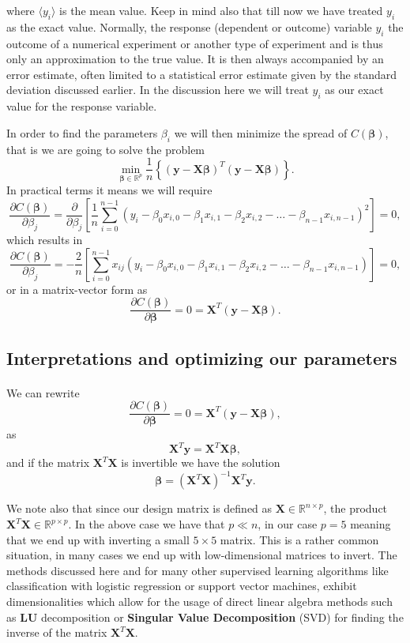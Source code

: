 \documentclass[%
oneside,                 %
final,                   %
10pt]{article}
\begin{document}
where $\langle y_i \rangle$ is the mean value. Keep in mind also that
till now we have treated $y_i$ as the exact value. Normally, the
response (dependent or outcome) variable $y_i$ the outcome of a
numerical experiment or another type of experiment and is thus only an
approximation to the true value. It is then always accompanied by an
error estimate, often limited to a statistical error estimate given by
the standard deviation discussed earlier. In the discussion here we
will treat $y_i$ as our exact value for the response variable.

In order to find the parameters $\beta_i$ we will then minimize the spread of $C(\bm{\beta})$, that is we are going to solve the problem
\[
{\displaystyle \min_{\bm{\beta}\in
{\mathbb{R}}^{p}}}\frac{1}{n}\left\{\left(\bm{y}-\bm{X}\bm{\beta}\right)^T\left(\bm{y}-\bm{X}\bm{\beta}\right)\right\}.
\]
In practical terms it means we will require
\[
\frac{\partial C(\bm{\beta})}{\partial \beta_j} = \frac{\partial }{\partial \beta_j}\left[ \frac{1}{n}\sum_{i=0}^{n-1}\left(y_i-\beta_0x_{i,0}-\beta_1x_{i,1}-\beta_2x_{i,2}-\dots-\beta_{n-1}x_{i,n-1}\right)^2\right]=0, 
\]
which results in
\[
\frac{\partial C(\bm{\beta})}{\partial \beta_j} = -\frac{2}{n}\left[ \sum_{i=0}^{n-1}x_{ij}\left(y_i-\beta_0x_{i,0}-\beta_1x_{i,1}-\beta_2x_{i,2}-\dots-\beta_{n-1}x_{i,n-1}\right)\right]=0, 
\]
or in a matrix-vector form as
\[
\frac{\partial C(\bm{\beta})}{\partial \bm{\beta}} = 0 = \bm{X}^T\left( \bm{y}-\bm{X}\bm{\beta}\right).  
\]




\subsection{Interpretations and optimizing our parameters}

\paragraph{}
We can rewrite
\[
\frac{\partial C(\bm{\beta})}{\partial \bm{\beta}} = 0 = \bm{X}^T\left( \bm{y}-\bm{X}\bm{\beta}\right),  
\]
as
\[
\bm{X}^T\bm{y} = \bm{X}^T\bm{X}\bm{\beta},  
\]
and if the matrix $\bm{X}^T\bm{X}$ is invertible we have the solution
\[
\bm{\beta} =\left(\bm{X}^T\bm{X}\right)^{-1}\bm{X}^T\bm{y}.
\]

We note also that since our design matrix is defined as $\bm{X}\in
{\mathbb{R}}^{n\times p}$, the product $\bm{X}^T\bm{X} \in
{\mathbb{R}}^{p\times p}$.  In the above case we have that $p \ll n$,
in our case $p=5$ meaning that we end up with inverting a small
$5\times 5$ matrix. This is a rather common situation, in many cases we end up with low-dimensional
matrices to invert. The methods discussed here and for many other
supervised learning algorithms like classification with logistic
regression or support vector machines, exhibit dimensionalities which
allow for the usage of direct linear algebra methods such as \textbf{LU} decomposition or \textbf{Singular Value Decomposition} (SVD) for finding the inverse of the matrix
$\bm{X}^T\bm{X}$.
\end{document}
